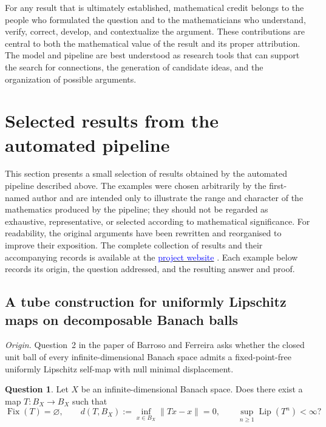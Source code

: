 \documentclass[11pt,reqno]{amsart}
\theoremstyle{plain}
\theoremstyle{definition}
\newtheorem{question}[question]{Question}
\newcommand{\websiteurl}{https://mathematical-discoveries-in-the-wild.github.io/}
\newcommand{\website}[1][project website]{%
  \href{\websiteurl}{\textcolor{blue}{#1}}%
}
\begin{document}
For any result that is ultimately established, mathematical credit belongs to the people who formulated the question and to the mathematicians who understand, verify, correct, develop, and contextualize the argument. These contributions are central to both the mathematical value of the result and its proper attribution. The model and pipeline are best understood as research tools that can support the search for connections, the generation of candidate ideas, and the organization of possible arguments.

\section{Selected results from the automated pipeline}
\label{sec:selected-pipeline-results}

This section presents a small selection of results obtained by the automated pipeline described above. The examples were chosen arbitrarily by the first-named author and are intended only to illustrate the range and character of the mathematics produced by the pipeline; they should not be regarded as exhaustive, representative, or selected according to mathematical significance. For readability, the original arguments have been rewritten and reorganised to improve their exposition. The complete collection of results and their accompanying records is available at the \website. Each example below records its origin, the question addressed, and the resulting answer and proof.

\subsection{A tube construction for uniformly Lipschitz maps on decomposable Banach balls}
\label{sec:selected-decomposable-uniformly-lipschitz}

\noindent\textit{Origin.} Question~2 in the paper of Barroso and Ferreira \cite{BarrosoFerreira2026RetractionMethods} asks whether the closed unit ball of every infinite-dimensional Banach space admits a fixed-point-free uniformly Lipschitz self-map with null minimal displacement.

\begin{question}
Let $X$ be an infinite-dimensional Banach space. Does there exist a map $T\colon B_X\to B_X$ such that
\begin{equation*}
 \operatorname{Fix}(T)=\varnothing,
 \qquad
 d(T,B_X):=\inf_{x\in B_X}\|Tx-x\|=0,
 \qquad
 \sup_{n\geq1}\operatorname{Lip}(T^n)<\infty?
\end{equation*}
\end{question}
\end{document}
